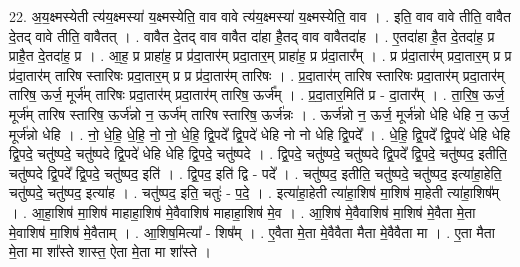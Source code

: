 \documentclass[17pt]{extarticle}
\begin{document}
22. अ॒य॒क्ष्मस्येती त्य॑य॒क्ष्मस्या॑ य॒क्ष्मस्येति॒ वाव वावे त्य॑य॒क्ष्मस्या॑ य॒क्ष्मस्येति॒ वाव । . इति॒ वाव वावे तीति॒ वावैत दे॒तद् वावे तीति॒ वावैतत् । . वावैत दे॒तद् वाव वावैत दा॑हा है॒तद् वाव वावैतदा॑ह । . ए॒तदा॑हा है॒त दे॒तदा॑ह॒ प्र प्राहै॒त दे॒तदा॑ह॒ प्र । . आ॒ह॒ प्र प्राहा॑ह॒ प्र प्र॑दा॒तार॑म् प्रदा॒तार॒म् प्राहा॑ह॒ प्र प्र॑दा॒तार᳚म् । . प्र प्र॑दा॒तार॑म् प्रदा॒तार॒म् प्र प्र प्र॑दा॒तार॑म् तारिष स्तारिषः प्रदा॒तार॒म् प्र प्र प्र॑दा॒तार॑म् तारिषः । . प्र॒दा॒तार॑म् तारिष स्तारिषः प्रदा॒तार॑म् प्रदा॒तार॑म् तारिष॒ ऊर्ज॒ मूर्ज॑म् तारिषः प्रदा॒तार॑म् प्रदा॒तार॑म् तारिष॒ ऊर्ज᳚म् । . प्र॒दा॒तार॒मिति॑ प्र - दा॒तार᳚म् । . ता॒रि॒ष॒ ऊर्ज॒ मूर्ज॑म् तारिष स्तारिष॒ ऊर्ज॑न्नो न॒ ऊर्ज॑म् तारिष स्तारिष॒ ऊर्ज॑न्नः । . ऊर्ज॑न्नो न॒ ऊर्ज॒ मूर्ज॑न्नो धेहि धेहि न॒ ऊर्ज॒ मूर्ज॑न्नो धेहि । . नो॒ धे॒हि॒ धे॒हि॒ नो॒ नो॒ धे॒हि॒ द्वि॒पदे᳚ द्वि॒पदे॑ धेहि नो नो धेहि द्वि॒पदे᳚ । . धे॒हि॒ द्वि॒पदे᳚ द्वि॒पदे॑ धेहि धेहि द्वि॒पदे॒ चतु॑ष्पदे॒ चतु॑ष्पदे द्वि॒पदे॑ धेहि धेहि द्वि॒पदे॒ चतु॑ष्पदे । . द्वि॒पदे॒ चतु॑ष्पदे॒ चतु॑ष्पदे द्वि॒पदे᳚ द्वि॒पदे॒ चतु॑ष्पद॒ इतीति॒ चतु॑ष्पदे द्वि॒पदे᳚ द्वि॒पदे॒ चतु॑ष्पद॒ इति॑ । . द्वि॒पद॒ इति॑ द्वि - पदे᳚ । . चतु॑ष्पद॒ इतीति॒ चतु॑ष्पदे॒ चतु॑ष्पद॒ इत्या॑हा॒हेति॒ चतु॑ष्पदे॒ चतु॑ष्पद॒ इत्या॑ह । . चतु॑ष्पद॒ इति॒ चतुः॑ - प॒दे॒ । . इत्या॑हा॒हेती त्या॑हा॒शिष॑ मा॒शिष॑ मा॒हेती त्या॑हा॒शिष᳚म् । . आ॒हा॒शिष॑ मा॒शिष॑ माहाहा॒शिष॑ मे॒वैवाशिष॑ माहाहा॒शिष॑ मे॒व । . आ॒शिष॑ मे॒वैवाशिष॑ मा॒शिष॑ मे॒वैता मे॒ता मे॒वाशिष॑ मा॒शिष॑ मे॒वैताम् । . आ॒शिष॒मित्या᳚ - शिष᳚म् । . ए॒वैता मे॒ता मे॒वैवैता मैता मे॒वैवैता मा । . ए॒ता मैता मे॒ता मा शा᳚स्ते शास्त॒ ऐता मे॒ता मा शा᳚स्ते । \newline
\end{document}
